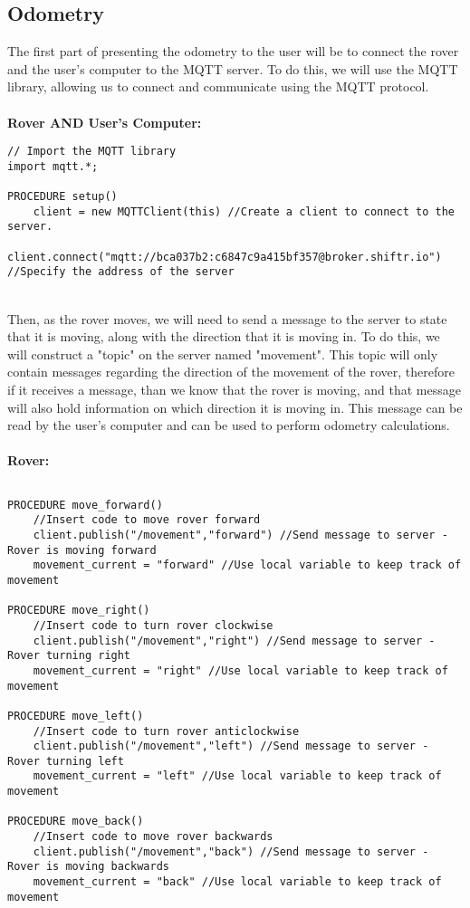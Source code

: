 \documentclass[11pt]{report}
\begin{document}
\subsection{Odometry}
The first part of presenting the odometry to the user will be to connect the rover and the user's computer to the MQTT server. To do this, we will use the MQTT library, allowing us to connect and communicate using the MQTT protocol.
\\\\
\textbf{Rover AND User's Computer:}
\begin{lstlisting}
// Import the MQTT library
import mqtt.*;

PROCEDURE setup() 
 	client = new MQTTClient(this) //Create a client to connect to the server.
 	client.connect("mqtt://bca037b2:c6847c9a415bf357@broker.shiftr.io") //Specify the address of the server

\end{lstlisting}
\noindent
\\ 
Then, as the rover moves, we will need to send a message to the server to state that it is moving, along with the direction that it is moving in. To do this, we will construct a "topic" on the server named "movement". This topic will only contain messages regarding the direction of the movement of the rover, therefore if it receives a message, than we know that the rover is moving, and that message will also hold information on which direction it is moving in. This message can be read by the user's computer and can be used to perform odometry calculations.
\\\\
\textbf{Rover:}
\begin{lstlisting}

PROCEDURE move_forward() 
	//Insert code to move rover forward
	client.publish("/movement","forward") //Send message to server - Rover is moving forward
	movement_current = "forward" //Use local variable to keep track of movement 

PROCEDURE move_right() 
	//Insert code to turn rover clockwise
	client.publish("/movement","right") //Send message to server - Rover turning right
	movement_current = "right" //Use local variable to keep track of movement 

PROCEDURE move_left() 
	//Insert code to turn rover anticlockwise
	client.publish("/movement","left") //Send message to server - Rover turning left
	movement_current = "left" //Use local variable to keep track of movement 

PROCEDURE move_back() 
	//Insert code to move rover backwards
	client.publish("/movement","back") //Send message to server - Rover is moving backwards
	movement_current = "back" //Use local variable to keep track of movement 

\end{lstlisting}
\end{document}
